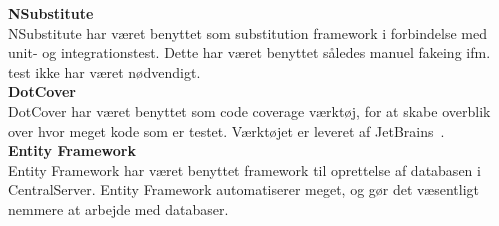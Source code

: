 \textbf{NSubstitute}~\cite{NSubstitute}\\
NSubstitute har været benyttet som substitution framework i forbindelse med unit- og integrationstest. Dette har været benyttet således manuel fakeing ifm. test ikke har været nødvendigt.\\

\textbf{DotCover}~\cite{dotCover}\\
DotCover har været benyttet som code coverage værktøj, for at skabe overblik over hvor meget kode som er testet. Værktøjet er leveret af JetBrains~\cite{JetBrains}.\\

\textbf{Entity Framework}~\cite{EF}\\
Entity Framework har været benyttet framework til oprettelse af databasen i CentralServer. Entity Framework automatiserer meget, og gør det væsentligt nemmere at arbejde med databaser.


